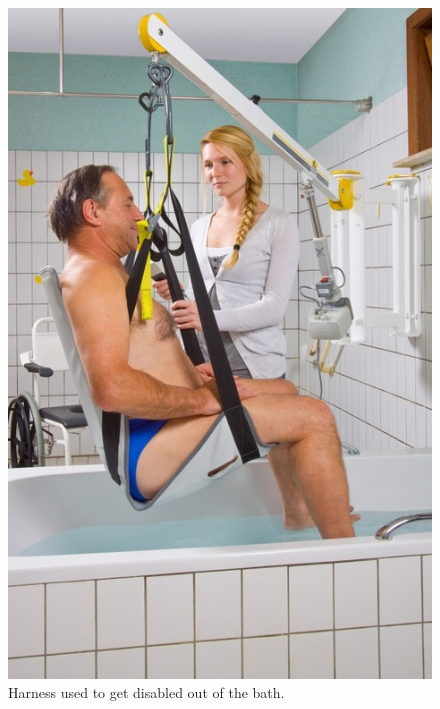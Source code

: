 \begin{figure}[h]
  \centering
     \includegraphics[scale=0.3]{images/harness.jpg}
   \caption{Harness used to get disabled out of the bath.}%
  \label{fig:harness.jpg}
\end{figure} 


